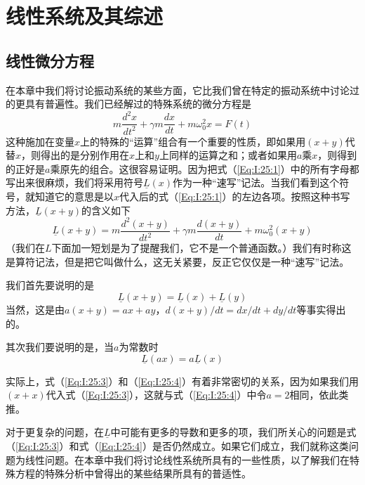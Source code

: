\chapter{线性系统及其综述}

\section{线性微分方程}

在本章中我们将讨论振动系统的某些方面，它比我们曾在特定的振动系统中讨论过的更具有普遍性。我们已经解过的特殊系统的微分方程是
\begin{equation}
    \label{Eq:I:25:1}
    m\frac{d^2x}{dt^2} + \gamma m \frac{dx}{dt} + m\omega_0^2x=F(t)
\end{equation}
这种施加在变量$x$上的特殊的“运算”组合有一个重要的性质，即如果用$(x+y)$代替$x$，则得出的是分别作用在$x$上和$y$上同样的运算之和；或者如果用$a$乘$x$，则得到的正好是$a$乘原先的组合。这很容易证明。因为把式（\ref{Eq:I:25:1}）中的所有字母都写出来很麻烦，我们将采用符号$\underline{L}(x)$作为一种“速写”记法。当我们看到这个符号，就知道它的意思是以$x$代入后的式（\ref{Eq:I:25:1}）的左边各项。按照这种书写方法，$\underline{L}(x+y)$的含义如下
\begin{equation}
    \label{Eq:I:25:2}
    \underline{L}(x+y)=m\frac{d^2(x+y)}{dt^2} + \gamma m\frac{d(x+y)}{dt} + m\omega_0^2(x+y)
\end{equation}
（我们在$L$下面加一短划是为了提醒我们，它不是一个普通函数。）我们有时称这是算符记法，但是把它叫做什么，这无关紧要，反正它仅仅是一种“速写”记法。

我们首先要说明的是
\begin{equation}
    \label{Eq:I:25:3}
    \underline{L}(x+y)=\underline{L}(x) + \underline{L}(y)
\end{equation}
当然，这是由$a(x+y)=ax+ay$，$d(x+y)/dt=dx/dt+dy/dt$等事实得出的。

其次我们要说明的是，当$a$为常数时
\begin{equation}
    \label{Eq:I:25:4}
    \underline{L}(ax)=a\underline{L}(x)
\end{equation}

实际上，式（\ref{Eq:I:25:3}）和（\ref{Eq:I:25:4}）有着非常密切的关系，因为如果我们用$(x+x)$代入式（\ref{Eq:I:25:3}），这就与式（\ref{Eq:I:25:4}）中令$a=2$相同，依此类推。

对于更复杂的问题，在$\underline{L}$中可能有更多的导数和更多的项，我们所关心的问题是式（\ref{Eq:I:25:3}）和式（\ref{Eq:I:25:4}）是否仍然成立。如果它们成立，我们就称这类问题为线性问题。在本章中我们将讨论线性系统所具有的一些性质，以了解我们在特殊方程的特殊分析中曾得出的某些结果所具有的普适性。

